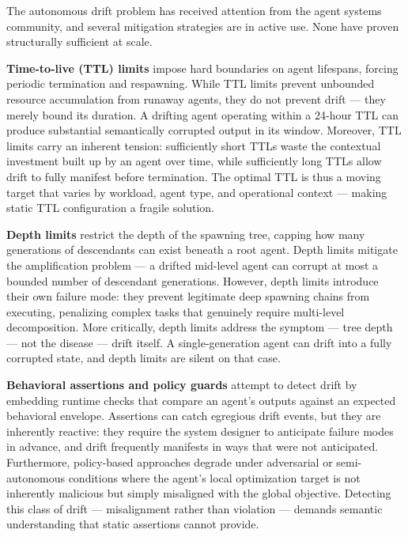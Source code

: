 
The autonomous drift problem has received attention from the agent systems community, and several mitigation strategies are in active use. None have proven structurally sufficient at scale.

\textbf{Time-to-live (TTL) limits} impose hard boundaries on agent lifespans, forcing periodic termination and respawning. While TTL limits prevent unbounded resource accumulation from runaway agents, they do not prevent drift — they merely bound its duration. A drifting agent operating within a 24-hour TTL can produce substantial semantically corrupted output in its window. Moreover, TTL limits carry an inherent tension: sufficiently short TTLs waste the contextual investment built up by an agent over time, while sufficiently long TTLs allow drift to fully manifest before termination. The optimal TTL is thus a moving target that varies by workload, agent type, and operational context — making static TTL configuration a fragile solution.

\textbf{Depth limits} restrict the depth of the spawning tree, capping how many generations of descendants can exist beneath a root agent. Depth limits mitigate the amplification problem — a drifted mid-level agent can corrupt at most a bounded number of descendant generations. However, depth limits introduce their own failure mode: they prevent legitimate deep spawning chains from executing, penalizing complex tasks that genuinely require multi-level decomposition. More critically, depth limits address the symptom — tree depth — not the disease — drift itself. A single-generation agent can drift into a fully corrupted state, and depth limits are silent on that case.

\textbf{Behavioral assertions and policy guards} attempt to detect drift by embedding runtime checks that compare an agent's outputs against an expected behavioral envelope. Assertions can catch egregious drift events, but they are inherently reactive: they require the system designer to anticipate failure modes in advance, and drift frequently manifests in ways that were not anticipated. Furthermore, policy-based approaches degrade under adversarial or semi-autonomous conditions where the agent's local optimization target is not inherently malicious but simply misaligned with the global objective. Detecting this class of drift — misalignment rather than violation — demands semantic understanding that static assertions cannot provide.

